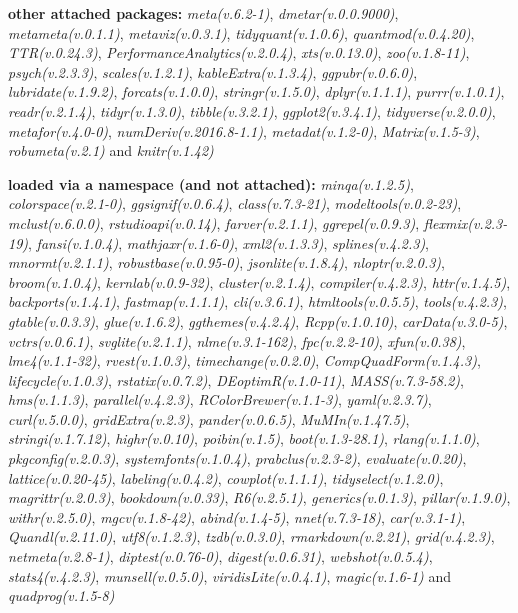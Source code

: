 \documentclass[
  bookmarksnumbered]{article}
\begin{document}
\textbf{other attached packages:}
\emph{meta(v.6.2-1)}, \emph{dmetar(v.0.0.9000)}, \emph{metameta(v.0.1.1)}, \emph{metaviz(v.0.3.1)}, \emph{tidyquant(v.1.0.6)}, \emph{quantmod(v.0.4.20)}, \emph{TTR(v.0.24.3)}, \emph{PerformanceAnalytics(v.2.0.4)}, \emph{xts(v.0.13.0)}, \emph{zoo(v.1.8-11)}, \emph{psych(v.2.3.3)}, \emph{scales(v.1.2.1)}, \emph{kableExtra(v.1.3.4)}, \emph{ggpubr(v.0.6.0)}, \emph{lubridate(v.1.9.2)}, \emph{forcats(v.1.0.0)}, \emph{stringr(v.1.5.0)}, \emph{dplyr(v.1.1.1)}, \emph{purrr(v.1.0.1)}, \emph{readr(v.2.1.4)}, \emph{tidyr(v.1.3.0)}, \emph{tibble(v.3.2.1)}, \emph{ggplot2(v.3.4.1)}, \emph{tidyverse(v.2.0.0)}, \emph{metafor(v.4.0-0)}, \emph{numDeriv(v.2016.8-1.1)}, \emph{metadat(v.1.2-0)}, \emph{Matrix(v.1.5-3)}, \emph{robumeta(v.2.1)} and \emph{knitr(v.1.42)}

\textbf{loaded via a namespace (and not attached):}
\emph{minqa(v.1.2.5)}, \emph{colorspace(v.2.1-0)}, \emph{ggsignif(v.0.6.4)}, \emph{class(v.7.3-21)}, \emph{modeltools(v.0.2-23)}, \emph{mclust(v.6.0.0)}, \emph{rstudioapi(v.0.14)}, \emph{farver(v.2.1.1)}, \emph{ggrepel(v.0.9.3)}, \emph{flexmix(v.2.3-19)}, \emph{fansi(v.1.0.4)}, \emph{mathjaxr(v.1.6-0)}, \emph{xml2(v.1.3.3)}, \emph{splines(v.4.2.3)}, \emph{mnormt(v.2.1.1)}, \emph{robustbase(v.0.95-0)}, \emph{jsonlite(v.1.8.4)}, \emph{nloptr(v.2.0.3)}, \emph{broom(v.1.0.4)}, \emph{kernlab(v.0.9-32)}, \emph{cluster(v.2.1.4)}, \emph{compiler(v.4.2.3)}, \emph{httr(v.1.4.5)}, \emph{backports(v.1.4.1)}, \emph{fastmap(v.1.1.1)}, \emph{cli(v.3.6.1)}, \emph{htmltools(v.0.5.5)}, \emph{tools(v.4.2.3)}, \emph{gtable(v.0.3.3)}, \emph{glue(v.1.6.2)}, \emph{ggthemes(v.4.2.4)}, \emph{Rcpp(v.1.0.10)}, \emph{carData(v.3.0-5)}, \emph{vctrs(v.0.6.1)}, \emph{svglite(v.2.1.1)}, \emph{nlme(v.3.1-162)}, \emph{fpc(v.2.2-10)}, \emph{xfun(v.0.38)}, \emph{lme4(v.1.1-32)}, \emph{rvest(v.1.0.3)}, \emph{timechange(v.0.2.0)}, \emph{CompQuadForm(v.1.4.3)}, \emph{lifecycle(v.1.0.3)}, \emph{rstatix(v.0.7.2)}, \emph{DEoptimR(v.1.0-11)}, \emph{MASS(v.7.3-58.2)}, \emph{hms(v.1.1.3)}, \emph{parallel(v.4.2.3)}, \emph{RColorBrewer(v.1.1-3)}, \emph{yaml(v.2.3.7)}, \emph{curl(v.5.0.0)}, \emph{gridExtra(v.2.3)}, \emph{pander(v.0.6.5)}, \emph{MuMIn(v.1.47.5)}, \emph{stringi(v.1.7.12)}, \emph{highr(v.0.10)}, \emph{poibin(v.1.5)}, \emph{boot(v.1.3-28.1)}, \emph{rlang(v.1.1.0)}, \emph{pkgconfig(v.2.0.3)}, \emph{systemfonts(v.1.0.4)}, \emph{prabclus(v.2.3-2)}, \emph{evaluate(v.0.20)}, \emph{lattice(v.0.20-45)}, \emph{labeling(v.0.4.2)}, \emph{cowplot(v.1.1.1)}, \emph{tidyselect(v.1.2.0)}, \emph{magrittr(v.2.0.3)}, \emph{bookdown(v.0.33)}, \emph{R6(v.2.5.1)}, \emph{generics(v.0.1.3)}, \emph{pillar(v.1.9.0)}, \emph{withr(v.2.5.0)}, \emph{mgcv(v.1.8-42)}, \emph{abind(v.1.4-5)}, \emph{nnet(v.7.3-18)}, \emph{car(v.3.1-1)}, \emph{Quandl(v.2.11.0)}, \emph{utf8(v.1.2.3)}, \emph{tzdb(v.0.3.0)}, \emph{rmarkdown(v.2.21)}, \emph{grid(v.4.2.3)}, \emph{netmeta(v.2.8-1)}, \emph{diptest(v.0.76-0)}, \emph{digest(v.0.6.31)}, \emph{webshot(v.0.5.4)}, \emph{stats4(v.4.2.3)}, \emph{munsell(v.0.5.0)}, \emph{viridisLite(v.0.4.1)}, \emph{magic(v.1.6-1)} and \emph{quadprog(v.1.5-8)}

\printbibliography
\end{document}
